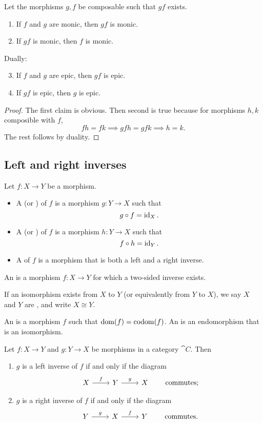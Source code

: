 \begin{lemma} \label{monicEpicCompositions}
Let the morphisms $g,f$ be composable such that $gf$ exists.
\begin{enumerate}
\item If $f$ and $g$ are monic, then $gf$ is monic.
\item If $gf$ is monic, then $f$ is monic.
\end{enumerate}
Dually:
\begin{enumerate}
\setcounter{enumi}{2}
\item If $f$ and $g$ are epic, then $gf$ is epic.
\item If $gf$ is epic, then $g$ is epic.
\end{enumerate}
\end{lemma}
\begin{proof}
The first claim is obvious. Then second is true because for morphisms $h,k$ composible with $f$,
\[ fh = fk \implies gfh = gfk \implies h = k. \]
The rest follows by duality.
\end{proof}

\subsection{Left and right inverses}
\begin{definition}
Let $f:X\to Y$ be a morphism.
\begin{itemize}
\item A  (or ) of $f$ is a morphism $g: Y\to X$ such that
\[ g\circ f = \operatorname{id}_X. \]
\item A  (or ) of $f$ is a morphism $h: Y\to X$ such that
\[ f\circ h = \operatorname{id}_Y. \]
\item A  of $f$ is a morphism that is both a left and a right inverse.
\end{itemize}
An  is a morphism $f: X\to Y$ for which a two-sided inverse exists.

If an isomorphism exists from $X$ to $Y$ (or equivalently from $Y$ to $X$), we say $X$ and $Y$ are , and write $X\cong Y$.
\end{definition}

An  is a morphism $f$ such that $\operatorname{dom}(f) = \operatorname{codom}(f)$. An  is an endomorphism that is an isomorphism.

\begin{lemma}
Let $f:X\to Y$ and $g:Y\to X$ be morphisms in a category $\cat{C}$. Then
\begin{enumerate}
\item $g$ is a left inverse of $f$ if and only if the diagram
\[ \begin{tikzcd}
X \rar{f} & Y \rar{g} & X
\end{tikzcd} \qquad \text{commutes;} \]
\item $g$ is a right inverse of $f$ if and only if the diagram
\[ \begin{tikzcd}
Y \rar{g} & X \rar{f} & Y
\end{tikzcd} \qquad \text{commutes.} \]
\end{enumerate}
\end{lemma}

